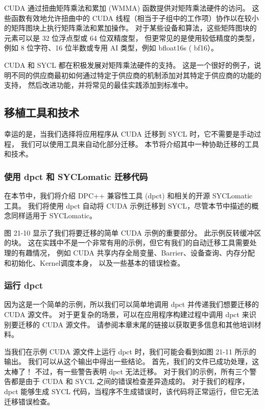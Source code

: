 CUDA 通过扭曲矩阵乘法和累加 (WMMA) 函数提供对矩阵乘法硬件的访问。 
这些函数有效地允许扭曲中的 CUDA 线程（相当于子组中的工作项）协作以在较小的矩阵图块上执行矩阵乘法和累加操作。 
对于某些设备和算法，这些矩阵图块的元素可以是 32 位浮点型或 64 位双精度型，
但更常见的是使用较低精度的类型，例如 8 位字符、16 位半数或专用 AI 类型，例如 bfloat16s ( bf16）。

CUDA 和 SYCL 都在积极发展对矩阵乘法硬件的支持。 
这是一个很好的例子，说明不同的供应商最初如何通过特定于供应商的机制添加对其特定于供应商的功能的支持，
然后改进功能，并将常见的最佳实践添加到标准中。

\subsection{移植工具和技术}
幸运的是，当我们选择将应用程序从 CUDA 迁移到 SYCL 时，它不需要是手动过程，
我们可以使用工具来自动化部分迁移。 本节将介绍其中一种协助迁移的工具和技术。

\subsubsection{使用 dpct 和 SYCLomatic 迁移代码}
在本节中，我们将介绍 DPC++ 兼容性工具 (dpct) 和相关的开源 SYCLomatic 工具。 
我们将使用 dpct 自动将 CUDA 示例迁移到 SYCL，尽管本节中描述的概念同样适用于 SYCLomatic。

图 21-10 显示了我们将要迁移的简单 CUDA 示例的重要部分。 此示例反转缓冲区的块。 
这在实践中不是一个非常有用的示例，但它有我们的自动迁移工具需要处理的有趣情况，
例如 CUDA 共享内存全局变量、Barrier、设备查询、内存分配和初始化、Kernel调度本身， 以及一些基本的错误检查。

\subsubsection{运行 dpct}

因为这是一个简单的示例，所以我们可以简单地调用 dpct 并传递我们想要迁移的 CUDA 源文件。 
对于更复杂的场景，可以在应用程序构建过程中调用 dpct 来识别要迁移的 CUDA 源文件。 
请参阅本章末尾的链接以获取更多信息和其他培训材料。

当我们在示例 CUDA 源文件上运行 dpct 时，我们可能会看到如图 21-11 所示的输出。 
我们可以从这个输出中得出一些结论。 首先，我们的文件已成功处理，这太棒了！ 不过，有一些警告表明 dpct 无法迁移。 
对于我们的示例，所有三个警告都是由于 CUDA 和 SYCL 之间的错误检查差异造成的。 
对于我们的程序，dpct 能够生成 SYCL 代码，当程序不生成错误时，该代码将正常运行，但它无法迁移错误检查。

